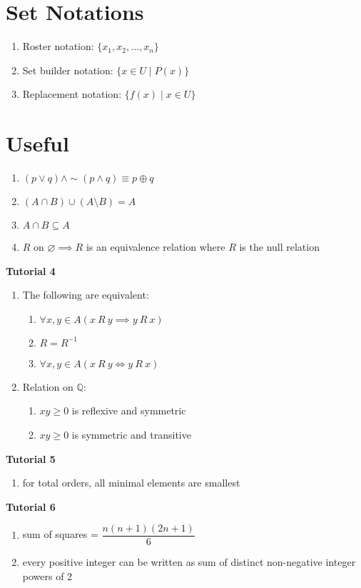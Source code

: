 \documentclass[landscape, a4paper]{article}
\let\geq\geqslant
\newcommand{\Q}{\mathbb{Q}}
\newcommand{\Or}{\vee}
\renewcommand{\and}{\wedge}
\newcommand{\customsection}[1]{
    \vspace*{-16pt}
    \section*{#1}
    \vspace*{-4pt}
}
\newcommand{\heading}[1]{
    \noindent\textbf{#1}
}
\newenvironment{wenumerate}{\begin{enumerate}[wide, labelindent=2pt]}{\end{enumerate}}
\begin{document}
\begin{multicols*}{4}
    \customsection{Set Notations}
    \begin{wenumerate}
        \item Roster notation: $\{x_1, x_2, ..., x_n\}$
        \item Set builder notation: $\{x\in U \mid P(x)\}$
        \item Replacement notation: $\{f(x) \mid x\in U\}$
    \end{wenumerate}

    \customsection{Useful}
    \begin{wenumerate}
        \item $(p \Or q) \and {\sim}(p \and q)\equiv p \oplus q$
        \item $(A\cap B)\cup (A\setminus B)=A$
        \item $A\cap B\subseteq A$
        \item $R$ on $\varnothing\implies R$ is an equivalence relation where $R$ is the null relation
    \end{wenumerate}
    \heading{Tutorial 4}
    \begin{wenumerate}
        \item The following are equivalent:
        \begin{enumerate}
            \item $\forall x, y\in A (x\ R\ y\implies y\ R\ x)$
            \item $R=R^{-1}$
            \item $\forall x,y\in A(x\ R\ y\iff y\ R\ x)$
        \end{enumerate}
        \item Relation on $\Q:$
        \begin{enumerate}
            \item $xy\geq 0$ is reflexive and symmetric
            \item $xy\geq 0$ is symmetric and transitive
        \end{enumerate}
    \end{wenumerate}
    \heading{Tutorial 5}
    \begin{enumerate}
        \item for total orders, all minimal elements are smallest
    \end{enumerate}
    \heading{Tutorial 6}
    \begin{enumerate}
        \item sum of squares = $\dfrac{n(n+1)(2n+1)}{6}$
        \item every positive integer can be written as sum of distinct non-negative integer powers of 2

\end{enumerate}
\end{multicols*}
\end{document}
